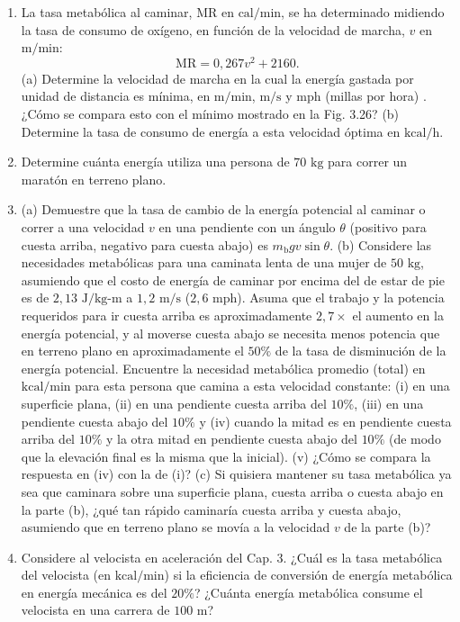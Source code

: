 \documentclass[12pt]{book}
\begin{document}
\begin{enumerate}
\item[6.63] La tasa metabólica al caminar, MR en $\text{cal/min}$, se ha determinado midiendo la tasa de consumo de oxígeno, en función de la velocidad de marcha, $v$ en $\text{m/min}$:
\begin{equation}
\text{MR} = 0{,}267 v^2 + 2160.
\label{eq:679}
\end{equation}
(a) Determine la velocidad de marcha en la cual la energía gastada por unidad de distancia es mínima, en $\text{m/min}$, $\text{m/s}$ y $\text{mph}$ (millas por hora) \cite{50}. ¿Cómo se compara esto con el mínimo mostrado en la Fig. 3.26? (b) Determine la tasa de consumo de energía a esta velocidad óptima en $\text{kcal/h}$.

\item[6.64] Determine cuánta energía utiliza una persona de $70\text{ kg}$ para correr un maratón en terreno plano.

\item[6.65] (a) Demuestre que la tasa de cambio de la energía potencial al caminar o correr a una velocidad $v$ en una pendiente con un ángulo $\theta$ (positivo para cuesta arriba, negativo para cuesta abajo) es $m_{\text{b}}gv \sin \theta$. (b) Considere las necesidades metabólicas para una caminata lenta de una mujer de $50\text{ kg}$, asumiendo que el costo de energía de caminar por encima del de estar de pie es de $2{,}13\text{ J/kg-m}$ a $1{,}2\text{ m/s}$ ($2{,}6\text{ mph}$). Asuma que el trabajo y la potencia requeridos para ir cuesta arriba es aproximadamente $2{,}7 \times$ el aumento en la energía potencial, y al moverse cuesta abajo se necesita menos potencia que en terreno plano en aproximadamente el $50\%$ de la tasa de disminución de la energía potencial. Encuentre la necesidad metabólica promedio (total) en $\text{kcal/min}$ para esta persona que camina a esta velocidad constante: (i) en una superficie plana, (ii) en una pendiente cuesta arriba del $10\%$, (iii) en una pendiente cuesta abajo del $10\%$ y (iv) cuando la mitad es en pendiente cuesta arriba del $10\%$ y la otra mitad en pendiente cuesta abajo del $10\%$ (de modo que la elevación final es la misma que la inicial). (v) ¿Cómo se compara la respuesta en (iv) con la de (i)? (c) Si quisiera mantener su tasa metabólica ya sea que caminara sobre una superficie plana, cuesta arriba o cuesta abajo en la parte (b), ¿qué tan rápido caminaría cuesta arriba y cuesta abajo, asumiendo que en terreno plano se movía a la velocidad $v$ de la parte (b)?

\item[6.66] Considere al velocista en aceleración del Cap. 3. ¿Cuál es la tasa metabólica del velocista (en $\text{kcal/min}$) si la eficiencia de conversión de energía metabólica en energía mecánica es del $20\%$? ¿Cuánta energía metabólica consume el velocista en una carrera de $100\text{ m}$?


\end{enumerate}
\end{document}
